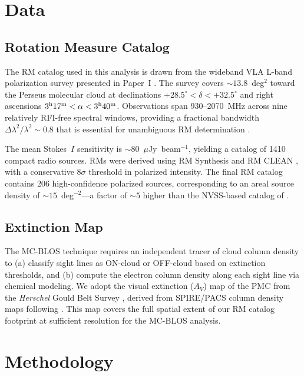 \documentclass[twocolumn]{aastex701}
\begin{document}
\section{Data}
\label{sec:data}

\subsection{Rotation Measure Catalog}

The RM catalog used in this analysis is drawn from the wideband VLA L-band polarization survey presented in Paper~I \citep{hajizadeh2026comprehensive}. The survey covers $\sim 13.8$~deg$^2$ toward the Perseus molecular cloud at declinations $+28.5^\circ < \delta < +32.5^\circ$ and right ascensions $3^{\rm h}17^{\rm m} < \alpha < 3^{\rm h}40^{\rm m}$. Observations span 930--2070~MHz across nine relatively RFI-free spectral windows, providing a fractional bandwidth $\Delta\lambda^2/\lambda^2 \sim 0.8$ that is essential for unambiguous RM determination \citep{brentjens2005}.

The mean Stokes~$I$ sensitivity is $\sim 80$~$\mu$Jy~beam$^{-1}$, yielding a catalog of 1410 compact radio sources. RMs were derived using RM Synthesis \citep{burn1966,brentjens2005} and RM CLEAN \citep{heald2009}, with a conservative $8\sigma$ threshold in polarized intensity. The final RM catalog contains 206 high-confidence polarized sources, corresponding to an areal source density of $\sim 15$~deg$^{-2}$---a factor of $\sim 5$ higher than the NVSS-based catalog of \citet{taylor2009}.

\subsection{Extinction Map}

The MC-BLOS technique requires an independent tracer of cloud column density to (a) classify sight lines as ON-cloud or OFF-cloud based on extinction thresholds, and (b) compute the electron column density along each sight line via chemical modeling. We adopt the visual extinction ($A_V$) map of the PMC from the \textit{Herschel} Gould Belt Survey \citep{andre2010}, derived from SPIRE/PACS column density maps following \citet{kainulainen2009}. This map covers the full spatial extent of our RM catalog footprint at sufficient resolution for the MC-BLOS analysis.

\section{Methodology}
\label{sec:method}
\end{document}
